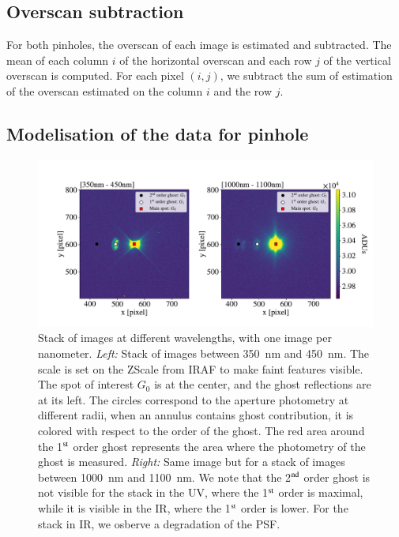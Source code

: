 \subsection{Overscan subtraction}
\label{sec:overscan}
For both pinholes, the overscan of each image is estimated and subtracted. The mean of each column $i$ of the horizontal overscan and each row $j$ of the vertical overscan is computed. For each pixel $(i, j)$, we subtract the sum of estimation of the overscan estimated on the column $i$ and the row $j$. \\

\subsection{Modelisation of the \SD data for \spinhole pinhole}


\begin{figure}[h]
    \centering
    \includegraphics[width=\columnwidth]{fig/ghost_contrast.pdf}
    \caption{Stack of images at different wavelengths, with one image per nanometer. \textit{Left:} Stack of images between \SI{350}{\nano\meter} and \SI{450}{\nano\meter}. The scale is set on the ZScale from IRAF to make faint features visible. The spot of interest $G_0$ is at the center, and the ghost reflections are at its left. The circles correspond to the aperture photometry at different radii, when an annulus contains ghost contribution, it is colored with respect to the order of the ghost. The red area around the 1$\textsuperscript{st}$ order ghost represents the area where the photometry of the ghost is measured. \textit{Right:} Same image but for a stack of images between \SI{1000}{\nano\meter} and \SI{1100}{\nano\meter}. We note that the 2$\textsuperscript{nd}$ order ghost is not visible for the stack in the UV, where the 1$\textsuperscript{st}$ order is maximal, while it is visible in the IR, where the 1$\textsuperscript{st}$ order is lower. For the stack in IR, we osberve a degradation of the \SD PSF.}
    \label{fig:ghost_contrast}
\end{figure}

